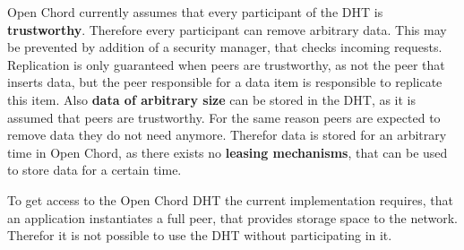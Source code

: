 Open Chord currently assumes that every participant of the DHT is {\bf trustworthy}. 
Therefore every participant can remove arbitrary data. This may be prevented by addition 
of a security manager, that checks incoming requests. Replication is only guaranteed 
when peers are trustworthy, as not the peer that inserts data, but the peer responsible for a data item is responsible to replicate this item. Also {\bf data of arbitrary size} 
can be stored in the DHT, as it is assumed that peers are trustworthy. For the same reason peers are expected to remove data they do not need anymore. Therefor data 
is stored for an arbitrary time in Open Chord, as there exists no 
{\bf leasing mechanisms}, that can be used to store data for a certain time. 

To get access to the Open Chord DHT the current implementation requires, that 
an application instantiates a full peer, that provides storage space to the network.
Therefor it is not possible to use the DHT without participating in it. 